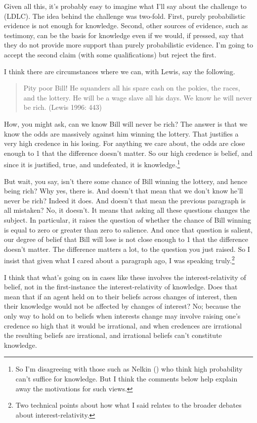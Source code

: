 \documentclass[
  11pt,
  letterpaper,
  DIV=11,
  numbers=noendperiod,
  twoside]{scrartcl}
\begin{document}
Given all this, it's probably easy to imagine what I'll say about the
challenge to (LDLC). The idea behind the challenge was two-fold. First,
purely probabilistic evidence is not enough for knowledge. Second, other
sources of evidence, such as testimony, can be the basis for knowledge
even if we would, if pressed, say that they do not provide more support
than purely probabilistic evidence. I'm going to accept the second claim
(with some qualifications) but reject the first.

I think there are circumstances where we can, with Lewis, say the
following.

\begin{quote}
Pity poor Bill! He squanders all his spare cash on the pokies, the
races, and the lottery. He will be a wage slave all his days. We know he
will never be rich. (Lewis 1996: 443)
\end{quote}

How, you might ask, can we know Bill will never be rich? The answer is
that we know the odds are massively against him winning the lottery.
That justifies a very high credence in his losing. For anything we care
about, the odds are close enough to 1 that the difference doesn't
matter. So our high credence is belief, and since it is justified, true,
and undefeated, it is knowledge.\footnote{So I'm disagreeing with those
  such as Nelkin () who think high
  probability can't suffice for knowledge. But I think the comments
  below help explain away the motivations for such views.}

But wait, you say, isn't there some chance of Bill winning the lottery,
and hence being rich? Why yes, there is. And doesn't that mean that we
don't know he'll never be rich? Indeed it does. And doesn't that mean
the previous paragraph is all mistaken? No, it doesn't. It means that
asking all these questions changes the subject. In particular, it raises
the question of whether the chance of Bill winning is equal to zero or
greater than zero to salience. And once that question is salient, our
degree of belief that Bill will lose is not close enough to 1 that the
difference doesn't matter. The difference matters a lot, to the question
you just raised. So I insist that given what I cared about a paragraph
ago, I was speaking truly.\footnote{Two technical points about how what
  I said relates to the broader debates about interest-relativity.}

I think that what's going on in cases like these involves the
interest-relativity of belief, not in the first-instance the
interest-relativity of knowledge. Does that mean that if an agent held
on to their beliefs across changes of interest, then their knowledge
would not be affected by changes of interest? No; because the only way
to hold on to beliefs when interests change may involve raising one's
credence so high that it would be irrational, and when credences are
irrational the resulting beliefs are irrational, and irrational beliefs
can't constitute knowledge.
\end{document}
